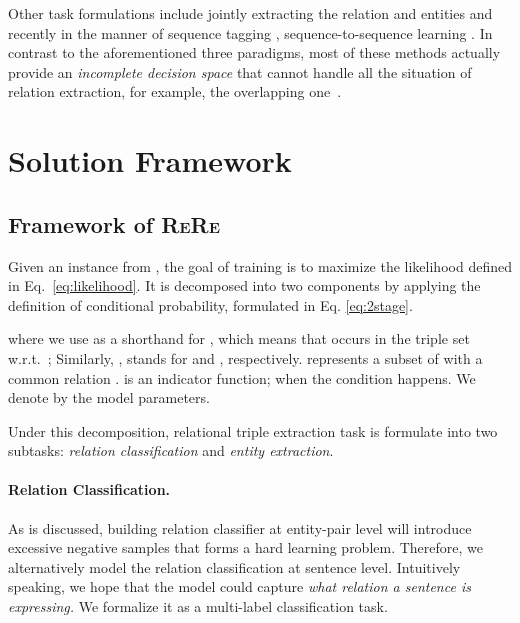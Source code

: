 \documentclass[11pt,a4paper]{article}
\newcommand{\mymethod}[0]{\textsc{ReRe} }
\begin{document}
Other task formulations include jointly extracting the relation and entities \cite{yu2010jointly,Li2014IncrementalJE,miwa2014modeling,gupta2016table,katiyar2017going,Ren2017CoTypeJE} and recently in the manner of sequence tagging \cite{Zheng2017JointEO}, sequence-to-sequence learning \cite{Zeng2018ExtractingRF}.
In contrast to the aforementioned three paradigms, most of these methods actually provide an \textit{incomplete decision space} that cannot handle all the situation of relation extraction, for example, the overlapping one~\cite{Wei2020ANC}.









\section{Solution Framework}

\subsection{Framework of \mymethod}
\label{sec:pdef}

Given an instance  from , the goal of training is to maximize the likelihood defined in Eq.~\eqref{eq:likelihood}. It is decomposed into two components by applying the definition of conditional probability, formulated in Eq. \eqref{eq:2stage}.


where we use  as a shorthand for , which means that  occurs in the triple set w.r.t.\ ; Similarly, ,  stands for  and , respectively.
 represents a subset of  with a common relation .
 is an indicator function;  when the condition happens.
We denote by  the model parameters.

Under this decomposition, relational triple extraction task is formulate into two subtasks: \textit{relation classification} and \textit{entity extraction}.
\paragraph*{Relation Classification.} As is discussed, building relation classifier at entity-pair level will introduce excessive negative samples that forms a hard learning problem.
Therefore, we alternatively model the relation classification at sentence level.
Intuitively speaking, we hope that the model could capture \textit{what relation a sentence is expressing.}
We formalize it as a multi-label classification task. 
\end{document}
